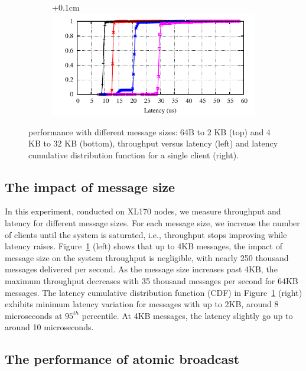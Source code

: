 \begin{figure}[ht]
\begin{subfigure}{\columnwidth}
  \end{subfigure}
  \begin{subfigure}{\columnwidth}
    \advance\leftskip+0.1cm
    \includegraphics[width=0.96\columnwidth]{figures/benchmark/graphs/figure-performance-vs-size-single-group-cdf-from-4k}
  \end{subfigure}
  \caption{\libname performance with different message sizes: 64B to 2 KB (top) and 4 KB to 32 KB (bottom), throughput versus latency (left) and latency cumulative distribution function for a single client (right).}
  \label{fig:1group_message_size}
\end{figure}

\subsection{The impact of message size}
\label{sec:evaluation:micro}

In this experiment, conducted on XL170 nodes, we measure \libname throughput and latency for different message sizes.
For each message size, we increase the number of clients until the system is saturated, i.e., throughput stops improving while latency raises.
Figure~\ref{fig:1group_message_size} (left) shows that up to 4KB messages, the impact of message size on the system throughput is negligible, with nearly 250 thousand messages delivered per second. 
As the message size increases past 4KB, the maximum throughput decreases with 35 thousand messages per second for 64KB messages.
The latency cumulative distribution function (CDF) in Figure~\ref{fig:1group_message_size} (right) exhibits minimum latency variation for messages with up to 2KB, around 8 microseconds at $95^{th}$ percentile. At 4KB messages, the latency slightly go up to around 10 microseconds.


\subsection{The performance of atomic broadcast}
\label{sec:evaluation:broadcast}

